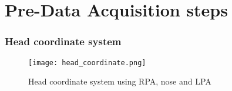 \section{Pre-Data Acquisition steps}
\begin{frame}
	\frametitle{Head coordinate system}
	\begin{figure}[hbt!]
		\centering
		\texttt{[image: head\_coordinate.png]}
		\caption{Head coordinate system using RPA, nose and LPA} 
		\label{fig:head_coordinate}
	\end{figure}
\end{frame}


